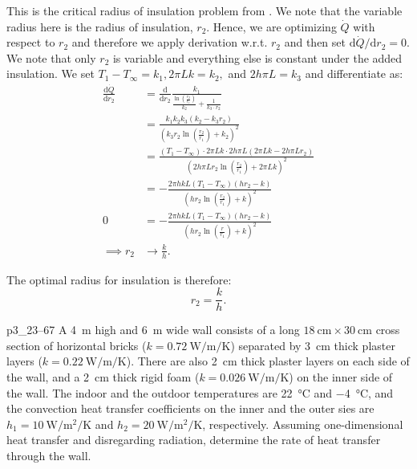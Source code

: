 \begin{derivation}
  This is the critical radius of insulation problem from .
  We note that the variable radius here is the radius of insulation, $r_2$.
  Hence, we are optimizing $\dot{Q}$ with respect to $r_2$ and therefore we apply derivation w.r.t. $r_2$ and then set $\mathrm{d}\dot{Q} / \mathrm{d} r_2 = 0$.
  We note that only $r_2$ is variable and everything else is constant under the added insulation.
  We set $T_1 - T_{\infty} = k_1, 2\pi L k = k_2,$ and $ 2 h\pi L = k_3$ and differentiate as:
  \begin{align*}
    \frac{\mathrm{d}\dot{Q}}{\mathrm{d}r_2} &= \frac{\mathrm{d}}{\mathrm{d}r_2} \frac{k_1}{\frac{\ln(\frac{r_2}{r_1})}{k_2} + \frac{1}{k_3 \cdot r_2}} \\ 
      &= \frac{k_1 k_2 k_3 \left(k_2-k_3 r_2\right)}{\left(k_3 r_2 \ln\left(\frac{r_2}{r_1}\right)+k_2\right)^2} \\
      &= \frac{\left( T_1 - T_{\infty} \right) \cdot 2 \pi L k \cdot 2 h \pi L \left( 2 \pi L k - 2 h \pi L r_2 \right)}{\left(2 h \pi L r_2 \ln \left( \frac{r_2}{r_1} \right) + 2\pi L k \right)^2 } \\ 
      &= -\frac{2 \pi  h k L \left(T_1-T_{\infty }\right) \left(h r_2-k\right)}{\left(h r_2 \ln \left(\frac{r_2}{r_1}\right)+k\right)^2} \\
    0 &= -\frac{2 \pi  h k L \left(T_1-T_{\infty }\right) \left(h r_2-k\right)}{\left(h r_2 \ln \left(\frac{r}{r_1}\right)+k\right)^2}  \\
    \implies r_2 &\to \frac{k}{h}
    .\end{align*}
\end{derivation}

\begin{finalresult}
  The optimal radius for insulation is therefore:
  \begin{equation*}
    r_2 = \frac{k}{h}
  .\end{equation*}
\end{finalresult}

\begin{problemwithimage}{p3_2}{3--67}
  A \qty{4}{\m} high and \qty{6}{\m} wide wall consists of a long $\qty{18}{\cm} \times \qty{30}{\cm} $ cross section of horizontal bricks ($k = \qty{0,72}{\W\per\m\per\K}$) separated by \qty{3}{\cm} thick plaster layers ($k = \qty{0,22}{\W\per\m\per\K}$).
  There are also \qty{2}{\cm} thick plaster layers on each side of the wall, and a \qty{2}{\cm} thick rigid foam ($k = \qty{0,026}{\W\per\m\per\K}$) on the inner side of the wall.
  The indoor and the outdoor temperatures are \qty{22}{\celsius} and \qty{-4}{\celsius}, and the convection heat transfer coefficients on the inner and the outer sies are $h_1 = \qty{10}{\W\per\m\squared\per\K}$ and $h_2 = \qty{20}{\W\per\m\squared\per\K}$, respectively.
  Assuming one-dimensional heat transfer and disregarding radiation, determine the rate of heat transfer through the wall.
\end{problemwithimage}

